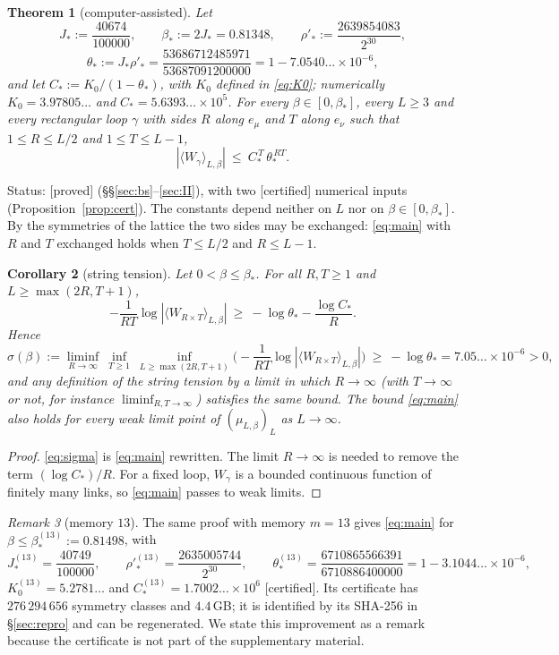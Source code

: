 \documentclass[11pt,a4paper]{article}
\theoremstyle{plain}
\newtheorem{theorem}{Theorem}[section]
\newtheorem{corollary}[theorem]{Corollary}
\theoremstyle{remark}
\newtheorem{remark}[theorem]{Remark}
\numberwithin{equation}{section}
\newcommand{\st}[1]{\textsf{[#1]}}
\begin{document}
\begin{theorem}[computer-assisted]\label{thm:main}
Let
\[
J_*:=\frac{40674}{100000},\qquad \beta_*:=2J_*=0.81348,\qquad \rho'_*:=\frac{2639854083}{2^{30}},
\]
\[
\theta_*:=J_*\rho'_*=\frac{53686712485971}{53687091200000}=1-7.0540\ldots\times10^{-6},
\]
and let $C_*:=K_0/(1-\theta_*)$, with $K_0$ defined in \eqref{eq:K0}; numerically $K_0=3.97805\ldots$ and
$C_*=5.6393\ldots\times10^{5}$. For every $\beta\in[0,\beta_*]$, every $L\ge3$ and every rectangular loop $\gamma$ with sides $R$
along $e_\mu$ and $T$ along $e_\nu$ such that $1\le R\le L/2$ and $1\le T\le L-1$,
\begin{equation}\label{eq:main}
|\langle W_\gamma\rangle_{L,\beta}|\ \le\ C_*^{\,T}\,\theta_*^{\,RT}.
\end{equation}
\end{theorem}
\noindent Status: \st{proved} (\S\S\ref{sec:bs}--\ref{sec:II}), with two \st{certified} numerical inputs
(Proposition~\ref{prop:cert}). The constants depend neither on $L$ nor on $\beta\in[0,\beta_*]$. By the symmetries of the lattice the
two sides may be exchanged: \eqref{eq:main} with $R$ and $T$ exchanged holds when $T\le L/2$ and $R\le L-1$.

\begin{corollary}[string tension]\label{cor:tension}
Let $0<\beta\le\beta_*$. For all $R,T\ge1$ and $L\ge\max(2R,T+1)$,
\begin{equation}\label{eq:sigma}
-\frac1{RT}\log|\langle W_{R\times T}\rangle_{L,\beta}|\ \ge\ -\log\theta_*-\frac{\log C_*}{R}.
\end{equation}
Hence
\[
\sigma(\beta):=\liminf_{R\to\infty}\ \inf_{T\ge1}\ \inf_{L\ge\max(2R,T+1)}\Big(-\frac1{RT}\log|\langle W_{R\times T}\rangle_{L,\beta}|
\Big)\ \ge\ -\log\theta_*=7.05\ldots\times10^{-6}>0,
\]
and any definition of the string tension by a limit in which $R\to\infty$ (with $T\to\infty$
or not, for instance $\liminf_{R,T\to\infty}$) satisfies the same bound. The bound \eqref{eq:main} also holds for every weak limit point of $(\mu_{L,\beta})_{L}$ as
$L\to\infty$.
\end{corollary}
\begin{proof}
\eqref{eq:sigma} is \eqref{eq:main} rewritten. The limit $R\to\infty$ is needed to remove the term $(\log C_*)/R$. For a fixed loop,
$W_\gamma$ is a bounded continuous function of finitely many links, so \eqref{eq:main} passes to weak limits.
\end{proof}

\begin{remark}[memory $13$]\label{rem:m13}
The same proof with memory $m=13$ gives \eqref{eq:main} for $\beta\le\beta_*^{(13)}:=0.81498$, with
\[
J_*^{(13)}=\frac{40749}{100000},\qquad \rho'^{(13)}_*=\frac{2635005744}{2^{30}},\qquad
\theta_*^{(13)}=\frac{6710865566391}{6710886400000}=1-3.1044\ldots\times10^{-6},
\]
$K_0^{(13)}=5.2781\ldots$ and $C_*^{(13)}=1.7002\ldots\times10^{6}$ \st{certified}. Its certificate has $276\,294\,656$ symmetry
classes and $4.4$\,GB; it is identified by its SHA-256 in \S\ref{sec:repro} and can be regenerated. We state this improvement as a
remark because the certificate is not part of the supplementary material.
\end{remark}
\end{document}
